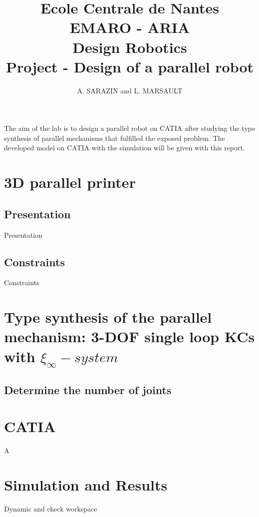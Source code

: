 \documentclass[11pt]{article}
\begin{document}
\title{Ecole Centrale de Nantes \\ EMARO - ARIA \\ Design Robotics \\ Project - Design of a parallel robot}
\author{A. SARAZIN and L. MARSAULT}
\date{}
\maketitle

The aim of the lab is to design a parallel robot on CATIA after studying the type synthesis of parallel mechanisms that fulfilled the exposed problem.
The developed model on CATIA with the simulation will be given with this report.

\section{3D parallel printer}
\subsection{Presentation}
Presentation

\subsection{Constraints}
Constraints

\section{Type synthesis of the parallel mechanism: 3-DOF single loop KCs with $\xi_{\infty}-system$}
\subsection{Determine the number of joints}


\section{CATIA}
A

\section{Simulation and Results}
Dynamic and check workspace
\end{document}
